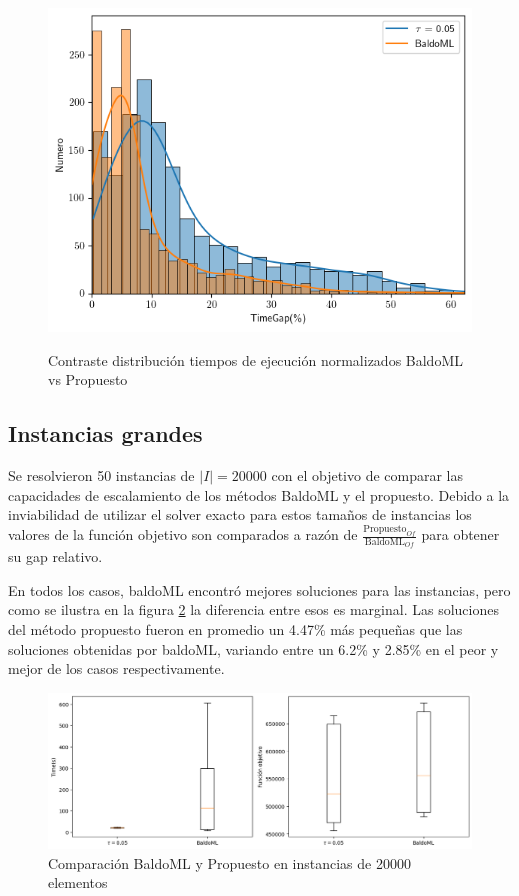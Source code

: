 \documentclass[spanish, a4paper, 12pt, openany,final]{book}
\begin{document}
\begin{figure}[H]
	\includegraphics{graphs/distributions_times.png}	
	\label{fig:distributions_times}
	\caption{Contraste distribución tiempos de ejecución normalizados BaldoML vs Propuesto}
\end{figure}

\subsection*{Instancias grandes}

Se resolvieron 50 instancias de $|I| = 20000$ con el objetivo de comparar las capacidades de escalamiento de los métodos BaldoML y el propuesto. Debido a la inviabilidad de utilizar el solver exacto para estos tamaños de instancias los valores de la función objetivo son comparados a razón de $\frac{\text{Propuesto}_{Of}}{\text{BaldoML}_{Of}}$ para obtener su gap relativo.

En todos los casos, baldoML encontró mejores soluciones para las instancias, pero como se ilustra en la figura \ref{fig:comparison} la diferencia entre esos es marginal. Las soluciones del método propuesto fueron en promedio un 4.47\% más pequeñas que las soluciones obtenidas por baldoML, variando entre un 6.2\% y 2.85\% en el peor y mejor de los casos respectivamente.

\begin{figure}[H]
	\includegraphics[scale=0.5]{graphs/comparison.png}	
	\caption{Comparación BaldoML y Propuesto en instancias de 20000 elementos}
	\label{fig:comparison}
\end{figure}
\end{document}
